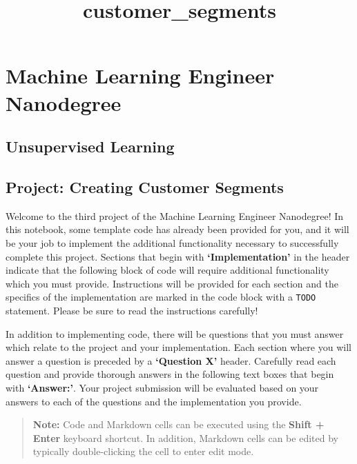 \documentclass[11pt]{article}
\title{customer\_segments}
\begin{document}
    
    
    \maketitle
    
    

    
    \hypertarget{machine-learning-engineer-nanodegree}{%
\section{Machine Learning Engineer
Nanodegree}\label{machine-learning-engineer-nanodegree}}

\hypertarget{unsupervised-learning}{%
\subsection{Unsupervised Learning}\label{unsupervised-learning}}

\hypertarget{project-creating-customer-segments}{%
\subsection{Project: Creating Customer
Segments}\label{project-creating-customer-segments}}

    Welcome to the third project of the Machine Learning Engineer
Nanodegree! In this notebook, some template code has already been
provided for you, and it will be your job to implement the additional
functionality necessary to successfully complete this project. Sections
that begin with \textbf{`Implementation'} in the header indicate that
the following block of code will require additional functionality which
you must provide. Instructions will be provided for each section and the
specifics of the implementation are marked in the code block with a
\texttt{\textquotesingle{}TODO\textquotesingle{}} statement. Please be
sure to read the instructions carefully!

In addition to implementing code, there will be questions that you must
answer which relate to the project and your implementation. Each section
where you will answer a question is preceded by a \textbf{`Question X'}
header. Carefully read each question and provide thorough answers in the
following text boxes that begin with \textbf{`Answer:'}. Your project
submission will be evaluated based on your answers to each of the
questions and the implementation you provide.

\begin{quote}
\textbf{Note:} Code and Markdown cells can be executed using the
\textbf{Shift + Enter} keyboard shortcut. In addition, Markdown cells
can be edited by typically double-clicking the cell to enter edit mode.
\end{quote}
\end{document}
